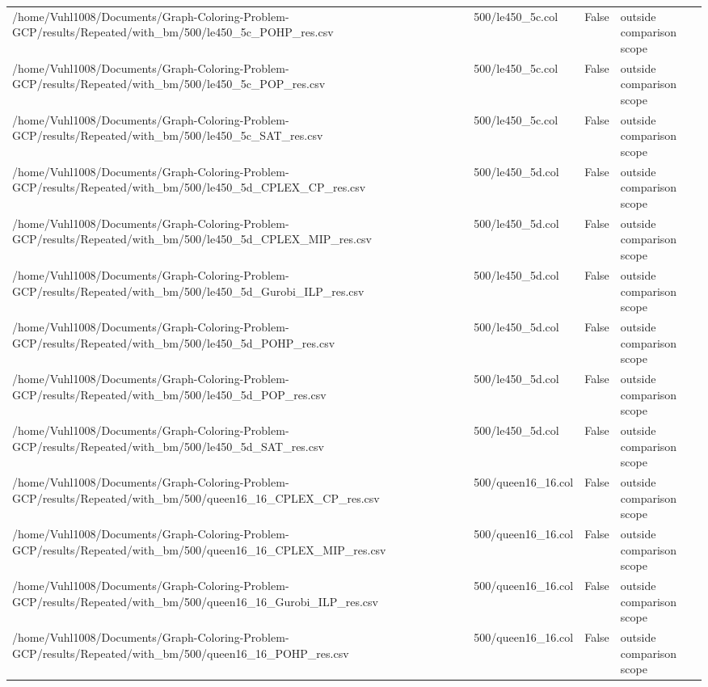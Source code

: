 \begin{table}[htbp]
\begin{tabular}{llll}
/home/Vuhl1008/Documents/Graph-Coloring-Problem-GCP/results/Repeated/with\_bm/500/le450\_5c\_POHP\_res.csv & 500/le450\_5c.col & False & outside comparison scope \\
/home/Vuhl1008/Documents/Graph-Coloring-Problem-GCP/results/Repeated/with\_bm/500/le450\_5c\_POP\_res.csv & 500/le450\_5c.col & False & outside comparison scope \\
/home/Vuhl1008/Documents/Graph-Coloring-Problem-GCP/results/Repeated/with\_bm/500/le450\_5c\_SAT\_res.csv & 500/le450\_5c.col & False & outside comparison scope \\
/home/Vuhl1008/Documents/Graph-Coloring-Problem-GCP/results/Repeated/with\_bm/500/le450\_5d\_CPLEX\_CP\_res.csv & 500/le450\_5d.col & False & outside comparison scope \\
/home/Vuhl1008/Documents/Graph-Coloring-Problem-GCP/results/Repeated/with\_bm/500/le450\_5d\_CPLEX\_MIP\_res.csv & 500/le450\_5d.col & False & outside comparison scope \\
/home/Vuhl1008/Documents/Graph-Coloring-Problem-GCP/results/Repeated/with\_bm/500/le450\_5d\_Gurobi\_ILP\_res.csv & 500/le450\_5d.col & False & outside comparison scope \\
/home/Vuhl1008/Documents/Graph-Coloring-Problem-GCP/results/Repeated/with\_bm/500/le450\_5d\_POHP\_res.csv & 500/le450\_5d.col & False & outside comparison scope \\
/home/Vuhl1008/Documents/Graph-Coloring-Problem-GCP/results/Repeated/with\_bm/500/le450\_5d\_POP\_res.csv & 500/le450\_5d.col & False & outside comparison scope \\
/home/Vuhl1008/Documents/Graph-Coloring-Problem-GCP/results/Repeated/with\_bm/500/le450\_5d\_SAT\_res.csv & 500/le450\_5d.col & False & outside comparison scope \\
/home/Vuhl1008/Documents/Graph-Coloring-Problem-GCP/results/Repeated/with\_bm/500/queen16\_16\_CPLEX\_CP\_res.csv & 500/queen16\_16.col & False & outside comparison scope \\
/home/Vuhl1008/Documents/Graph-Coloring-Problem-GCP/results/Repeated/with\_bm/500/queen16\_16\_CPLEX\_MIP\_res.csv & 500/queen16\_16.col & False & outside comparison scope \\
/home/Vuhl1008/Documents/Graph-Coloring-Problem-GCP/results/Repeated/with\_bm/500/queen16\_16\_Gurobi\_ILP\_res.csv & 500/queen16\_16.col & False & outside comparison scope \\
/home/Vuhl1008/Documents/Graph-Coloring-Problem-GCP/results/Repeated/with\_bm/500/queen16\_16\_POHP\_res.csv & 500/queen16\_16.col & False & outside comparison scope \\

\end{tabular}
\end{table}
